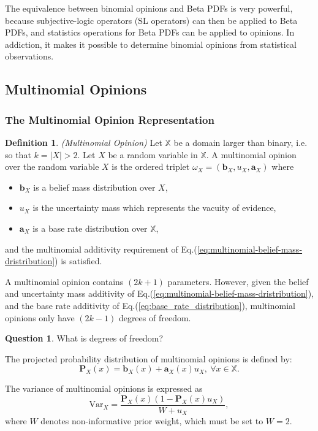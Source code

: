 \documentclass[a4paper,12pt]{article}
\theoremstyle{definition}
\newtheorem{question}{Question}[section]
\newtheorem{definition}{Definition}[section]
\numberwithin{equation}{section}
\begin{document}
The equivalence between binomial opinions and Beta PDFs is very powerful, because subjective-logic operators (SL operators) can then be applied to Beta PDFs, and statistics operations for Beta PDFs can be applied to opinions. In addiction, it makes it possible to determine binomial opinions from statistical observations.

\subsection{Multinomial Opinions}

\subsubsection{The Multinomial Opinion Representation}

\begin{definition}
	\emph{(Multinomial Opinion)} Let $\mathbb{X}$ be a domain larger than binary, i.e.
so that $k = |X| > 2$. Let $X$ be a random variable in $\mathbb{X}$. A multinomial opinion over
the random variable $X$ is the ordered triplet $\omega_X = (\mathbf{b}_X, u_X , \mathbf{a}_X)$ where
	\begin{itemize}
		\item $\mathbf{b}_X$ is a belief mass distribution over $X$,
		\item $u_X$ is the uncertainty mass which represents the vacuity of evidence,
		\item $\mathbf{a}_X$ is a base rate distribution over $\mathbb{X}$,
	\end{itemize}
	and the multinomial additivity requirement of Eq.(\ref{eq:multinomial-belief-mass-dristribution}) is satisfied.
\end{definition}

A multinomial opinion contains $(2k + 1)$ parameters. However, given the belief and uncertainty mass additivity of Eq.(\ref{eq:multinomial-belief-mass-dristribution}), and the base rate additivity of Eq.(\ref{eq:base_rate_distribution}), multinomial opinions only have $(2k - 1)$ degrees of freedom.

\begin{question}
	What is degrees of freedom?
\end{question}

The projected probability distribution of multinomial opinions is defined by:
\begin{equation}
	\mathbf{P}_X(x) = \mathbf{b}_X(x) + \mathbf{a}_X(x) u_X,\ \forall x \in \mathbb{X}\text{.}
\end{equation}

The variance of multinomial opinions is expressed as
\begin{equation}
	\mathrm{Var}_X = \dfrac{\mathbf{P}_X(x)(1 - \mathbf{P}_X(x)u_X)}{W + u_X},
\end{equation}
where $W$ denotes non-informative prior weight, which must be set to $W = 2$.
\end{document}
